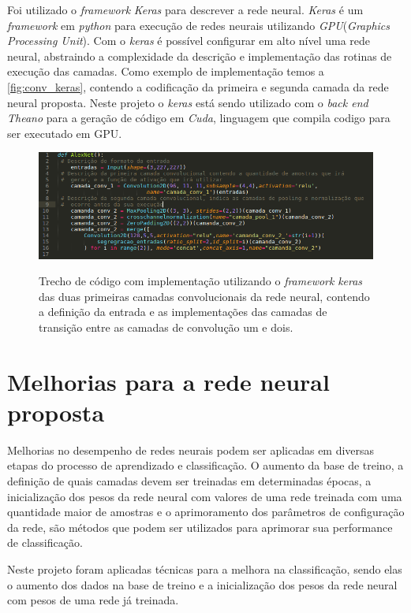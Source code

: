 \par Foi utilizado o \textit{framework} \textit{Keras} \cite{chollet2015keras} para descrever a rede neural. \textit{Keras} é um \textit{framework} em \textit{python} para execução de redes neurais utilizando \textit{GPU}(\textit{Graphics Processing Unit}). Com o \textit{keras} é possível configurar em alto nível uma rede neural, abstraindo a complexidade da descrição e implementação das rotinas de execução das camadas. Como exemplo de implementação temos a \autoref{fig:conv_keras}, contendo a codificação da primeira e segunda camada da rede neural proposta. Neste projeto o \textit{keras} está sendo utilizado com o \textit{back end Theano} \cite{2016arXiv160502688full} para a geração de código em \textit{Cuda}, linguagem que compila codigo para ser executado em GPU.
\begin{figure}[H]
  \centering
  \caption{Trecho de código com implementação utilizando o \textit{framework} \textit{keras} das duas primeiras camadas convolucionais da rede neural, contendo a definição da entrada e as implementações das camadas de transição entre as camadas de convolução um e dois.}
  \includegraphics[width=400pt]{dados/figuras/exemplo_keras}
  \label{fig:conv_keras}
\end{figure}


\section{Melhorias para a rede neural proposta}

Melhorias no desempenho de redes neurais podem ser aplicadas em diversas etapas do processo de aprendizado e classificação. O aumento da base de treino, a definição de quais camadas devem ser treinadas em determinadas épocas, a inicialização dos pesos da rede neural com valores de uma rede treinada com uma quantidade maior de amostras e o aprimoramento dos parâmetros de configuração da rede, são métodos que podem ser utilizados para aprimorar sua performance de classificação.

\par Neste projeto foram aplicadas técnicas para a melhora na classificação, sendo elas
o aumento dos dados na base de treino e a inicialização dos pesos da rede neural com pesos de uma rede já treinada. %

